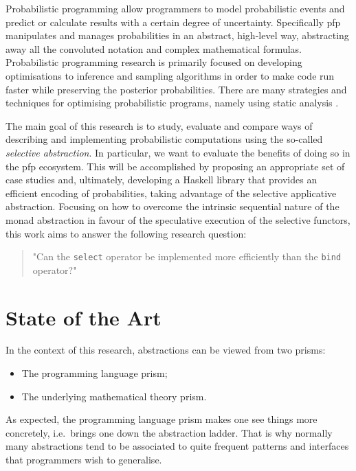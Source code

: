 \documentclass[
  oneside,
  11pt, a4paper,
  footinclude=true,
  headinclude=true,
  cleardoublepage=empty
]{scrbook}
\theoremstyle{definition}
\theoremstyle{definition}
\begin{document}
	Probabilistic programming allow programmers to model probabilistic events and predict or calculate results with a certain degree of uncertainty. Specifically \gls{pfp} manipulates and manages probabilities in an abstract, high-level way, abstracting away all the convoluted notation and complex mathematical formulas. Probabilistic programming research is primarily focused on developing optimisations to inference and sampling algorithms in order to make code run faster while preserving the posterior probabilities. There are many strategies and techniques for optimising probabilistic programs, namely using static analysis \citep{bernstein2019static}.
    
    The main goal of this research is to study, evaluate and compare ways of describing and implementing probabilistic computations using the so-called \emph{selective abstraction}. In particular, we want to evaluate the benefits of doing so in the \gls{pfp} ecosystem. This will be accomplished by proposing an appropriate set of case studies and, ultimately, developing a Haskell library that provides an efficient encoding of probabilities, taking advantage of the selective applicative abstraction. Focusing on how to overcome the intrinsic sequential nature of the monad abstraction \citep{Scibior:2015:PPP:2887747.2804317} in favour of the speculative execution of the selective functors, this work aims to answer the following research question:
        \begin{quote}
        "Can the \texttt{select} operator be implemented more efficiently than the \texttt{bind} operator?"
        \end{quote}

	\section{State of the Art}\label{sec-state-art}
	In the context of this research, abstractions can be viewed from two prisms:
	\begin{itemize}
	   \item The programming language prism;
	   \item The underlying mathematical theory prism.
	\end{itemize}{}
	    
	As expected, the programming language prism makes one see things more concretely, i.e.\ brings one down the abstraction ladder. That is why normally many abstractions tend to be associated to quite frequent patterns and interfaces that programmers wish to generalise.
	    
\end{document}
